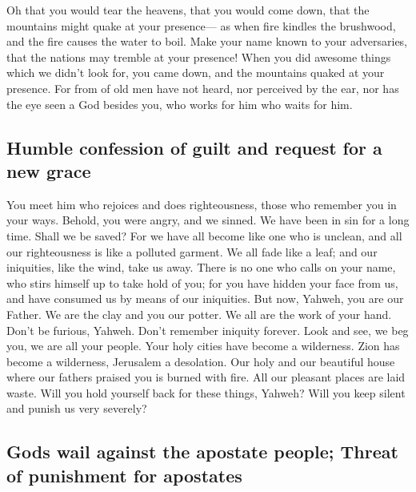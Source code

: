  Oh that you would tear the heavens, that you would come
down, that the mountains might quake at your presence--- 
as when fire kindles the brushwood, and the fire causes the water to
boil. Make your name known to your adversaries, that the nations may
tremble at your presence!  When you did awesome things
which we didn't look for, you came down, and the mountains quaked at
your presence.  For from of old men have not heard, nor
perceived by the ear, nor has the eye seen a God besides you, who works
for him who waits for him.

\hypertarget{humble-confession-of-guilt-and-request-for-a-new-grace}{%
\subsection{Humble confession of guilt and request for a new
grace}\label{humble-confession-of-guilt-and-request-for-a-new-grace}}

 You meet him who rejoices and does righteousness, those
who remember you in your ways. Behold, you were angry, and we sinned. We
have been in sin for a long time. Shall we be saved?  For
we have all become like one who is unclean, and all our righteousness is
like a polluted garment. We all fade like a leaf; and our iniquities,
like the wind, take us away.  There is no one who calls on
your name, who stirs himself up to take hold of you; for you have hidden
your face from us, and have consumed us by means of our iniquities.
 But now, Yahweh, you are our Father. We are the clay and
you our potter. We all are the work of your hand.  Don't
be furious, Yahweh. Don't remember iniquity forever. Look and see, we
beg you, we are all your people.  Your holy cities have
become a wilderness. Zion has become a wilderness, Jerusalem a
desolation.  Our holy and our beautiful house where our
fathers praised you is burned with fire. All our pleasant places are
laid waste.  Will you hold yourself back for these
things, Yahweh? Will you keep silent and punish us very severely?

\hypertarget{gods-wail-against-the-apostate-people-threat-of-punishment-for-apostates}{%
\subsection{Gods wail against the apostate people; Threat of punishment
for
apostates}\label{gods-wail-against-the-apostate-people-threat-of-punishment-for-apostates}}

